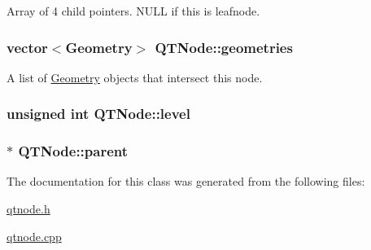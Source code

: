 Array of 4 child pointers. N\+U\+L\+L if this is leafnode. 

\hypertarget{class_q_t_node_aa48645f4e491ae201feabd5199eb549e}{
\subsubsection[{geometries}]{\setlength{\rightskip}{0pt plus 5cm}vector$<${\bf Geometry}$>$ Q\+T\+Node\+::geometries}}\label{class_q_t_node_aa48645f4e491ae201feabd5199eb549e}


A list of \hyperlink{class_geometry}{Geometry} objects that intersect this node. 

\hypertarget{class_q_t_node_a40d33fe4103a3a895137cfb08c246010}{
\subsubsection[{level}]{\setlength{\rightskip}{0pt plus 5cm}unsigned int Q\+T\+Node\+::level}}\label{class_q_t_node_a40d33fe4103a3a895137cfb08c246010}
\hypertarget{class_q_t_node_a1d8821384dae11149cb108440b108176}{
\subsubsection[{parent}]{$\ast$ Q\+T\+Node\+::parent}}\label{class_q_t_node_a1d8821384dae11149cb108440b108176}


The documentation for this class was generated from the following files\+:\begin{DoxyCompactItemize}
\item 
\hyperlink{qtnode_8h}{qtnode.\+h}\item 
\hyperlink{qtnode_8cpp}{qtnode.\+cpp}\end{DoxyCompactItemize}
